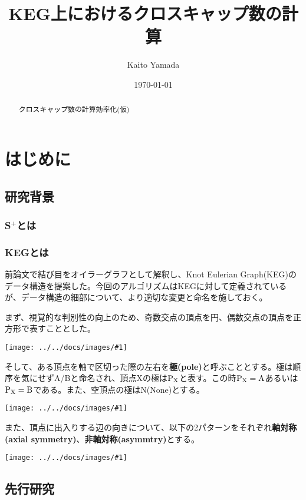 \documentclass[11pt,a4j]{jarticle}
\title{KEG上におけるクロスキャップ数の計算}
\author{Kaito Yamada}
\date{\today}
\newcommand{\splus}{S${}^\text{+}$}
\newcommand{\fl}[1]{$\rm{#1}$}
\newcommand{\image}[1]{\begin{center}\texttt{[image: ../../docs/images/\#1]}\end{center}}
\begin{document}
\maketitle
\vspace{30mm}
\begin{abstract}
    クロスキャップ数の計算効率化(仮)
\end{abstract}

\clearpage

\tableofcontents
\clearpage

\pagestyle{plain}
\lhead{\rightmark}

\section{はじめに} %

\subsection{研究背景}
\subsubsection{\splus とは}
\subsubsection{KEGとは}
前論文\cite{keg}で結び目をオイラーグラフとして解釈し、Knot Eulerian Graph(KEG)のデータ構造を提案した。今回のアルゴリズムはKEGに対して定義されているが、データ構造の細部について、より適切な変更と命名を施しておく。

まず、視覚的な判別性の向上のため、奇数交点の頂点を円、偶数交点の頂点を正方形で表すこととした。
\image{about_parity.jpg}

そして、ある頂点を軸で区切った際の左右を\textbf{極(pole)}と呼ぶこととする。極は順序を気にせずA/Bと命名され、頂点Xの極は\fl{P_X}と表す。この時\fl{P_X=A}あるいは\fl{P_X=B}である。また、空頂点の極はN(None)とする。
\image{about_pole.jpg}

また、頂点に出入りする辺の向きについて、以下の2パターンをそれぞれ\textbf{軸対称(axial symmetry)}、\textbf{非軸対称(asymmtry)}とする。
\image{about_axis.jpg}

\subsection{先行研究}
\end{document}
